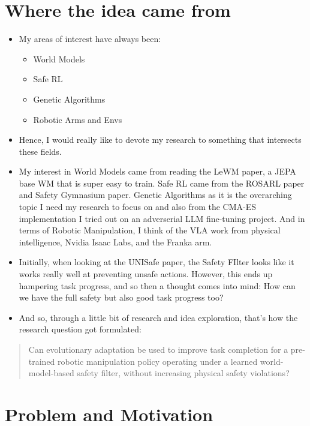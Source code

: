 \section*{Where the idea came from}

\begin{itemize}
  \item My areas of interest have always been:
  \begin{itemize}
    \item World Models
    \item Safe RL
    \item Genetic Algorithms
    \item Robotic Arms and Envs
  \end{itemize}
  \item Hence, I would really like to devote my research to something that intersects these fields.
  \item My interest in World Models came from reading the LeWM paper, a JEPA base WM that is super easy to train. Safe RL came from the ROSARL paper and Safety Gymnasium paper. Genetic Algorithms as it is the overarching topic I need my research to focus on and also from the CMA-ES implementation I tried out on an adverserial LLM fine-tuning project. And in terms of Robotic Manipulation, I think of the VLA work from physical intelligence, Nvidia Isaac Labs, and the Franka arm.
  \item Initially, when looking at the UNISafe paper, the Safety FIlter looks like it works really well at preventing unsafe actions. However, this ends up hampering task progress, and so then a thought comes into mind: How can we have the full safety but also good task progress too?
  \item And so, through a little bit of research and idea exploration, that’s how the research question got formulated:
\end{itemize}

\begin{quote}
  Can evolutionary adaptation be used to improve task completion for a pre-trained robotic manipulation policy operating under a learned world-model-based safety filter, without increasing physical safety violations?
\end{quote}

\clearpage
\section*{Problem and Motivation}

